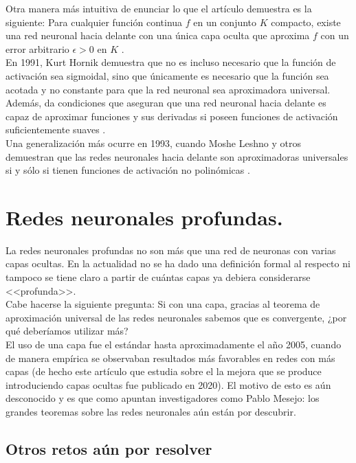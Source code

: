 \documentclass[11pt,twoside,titlepage,a4paper]{article}
\numberwithin{equation}{section} %
\theoremstyle{usual}
\begin{document}
Otra manera más intuitiva de enunciar lo que el artículo demuestra 
es la siguiente: Para cualquier función continua $f$ en un
conjunto $K$ compacto, existe una red neuronal hacia delante con una
única capa oculta que aproxima $f$ con un error arbitrario 
$\epsilon>0$ en $K$ \cite{aproximator}.\\

En 1991, Kurt Hornik demuestra que no es incluso necesario que la
función de activación sea sigmoidal, sino que únicamente es
necesario que la función sea acotada y no constante para que la
red neuronal sea aproximadora universal. Además, da condiciones que
aseguran que una red neuronal hacia delante es capaz de aproximar
funciones y sus derivadas si poseen funciones de activación 
suficientemente suaves \cite{aproximator-nonsigmoid}. \\

Una generalización más ocurre en 1993, cuando Moshe Leshno y otros
demuestran que las redes neuronales hacia delante son aproximadoras
universales si y sólo si tienen funciones de activación no 
polinómicas \cite{aproximator-nonpolinom}.

\newpage
\section{ Redes neuronales profundas.}
La redes neuronales profundas no son  más que una red de neuronas con varias capas ocultas. En la actualidad no se ha dado una definición formal al respecto ni tampoco se tiene claro a partir de cuántas capas ya debiera considerarse <<profunda>>. \\

Cabe hacerse la siguiente pregunta: Si con una capa, gracias al teorema de aproximación universal de las redes neuronales sabemos que es convergente, ¿por qué deberíamos utilizar más? \\ 

El uso de una capa fue el estándar hasta aproximadamente el año 2005, cuando de manera empírica se observaban resultados más favorables en redes con más capas  \cite{numero-capas} (de hecho este artículo que estudia sobre el la mejora que se produce introduciendo capas ocultas fue publicado en 2020). El motivo de esto es aún desconocido y es que como apuntan investigadores como Pablo Mesejo: los grandes teoremas sobre las redes neuronales aún están por descubrir. 

\subsection{Otros retos aún por resolver}
\end{document}
